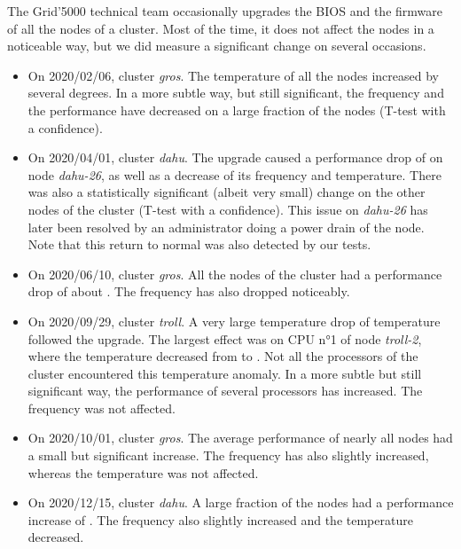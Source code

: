                 The Grid'5000 technical team occasionally upgrades the BIOS and the firmware of all the nodes of a
                cluster. Most of the time, it does not affect the nodes in a noticeable way, but we did measure a
                significant change on several occasions.
                \begin{itemize}
                    \item On 2020/02/06, cluster \emph{gros}. The temperature of all the nodes increased by several
                        degrees. In a more subtle way, but still significant, the frequency and the \dgemm performance
                        have decreased on a large fraction of the nodes (T-test with a  confidence).
                    \item On 2020/04/01, cluster \emph{dahu}. The upgrade caused a performance drop of 
                        on node \emph{dahu-26}, as well as a decrease of its frequency and temperature. There was also a
                        statistically significant (albeit very small) change on the other nodes of the cluster (T-test
                        with a  confidence). This issue on \emph{dahu-26} has later been resolved by
                        an administrator doing a power drain of the node. Note that this return to normal was also
                        detected by our tests.
                    \item On 2020/06/10, cluster \emph{gros}. All the nodes of the cluster had a performance drop of
                        about . The frequency has also dropped noticeably.
                    \item On 2020/09/29, cluster \emph{troll}. A very large temperature drop of temperature followed the
                        upgrade. The largest effect was on CPU n°1 of node \emph{troll-2}, where the temperature
                        decreased from  to . Not all the processors of
                        the cluster encountered this temperature anomaly. In a more subtle but still significant way,
                        the \dgemm performance of several processors has increased. The frequency was not affected.
                    \item On 2020/10/01, cluster \emph{gros}. The average \dgemm performance of nearly all nodes had a
                        small but significant increase. The frequency has also slightly increased, whereas the
                        temperature was not affected.
                    \item On 2020/12/15, cluster \emph{dahu}. A large fraction of the nodes had a performance increase
                        of . The frequency also slightly increased and the temperature decreased.
                \end{itemize}

